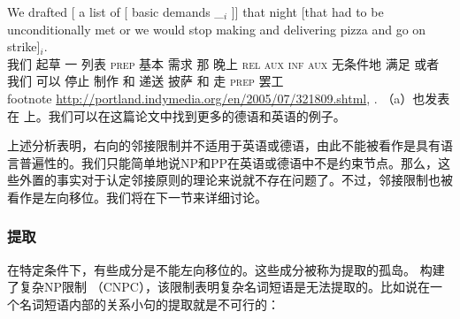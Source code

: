 \ex 
\gll We drafted [ a list of [ basic demands \_$_i$ ]] that night [that had to be unconditionally met or we would stop making and delivering pizza and go on strike]$_i$.\\
我们 起草 {} 一 列表 \textsc{prep} {} 基本 需求  {} {} 那 晚上 \spacebr\textsc{rel} \textsc{aux} \textsc{inf} \textsc{aux} 无条件地 满足 或者 我们 可以 停止 制作 和 递送 披萨 和 走 \textsc{prep} 罢工\\
footnote{%
\url{http://portland.indymedia.org/en/2005/07/321809.shtml}, .
}
\zl
（a）也发表在 上。我们可以在这篇论文中找到更多的德语和英语的例子。

上述分析表明，右向的邻接限制并不适用于英语或德语，由此不能被看作是具有语言普遍性的。我们只能简单地说NP和PP在英语或德语中不是约束节点。那么，这些外置的事实对于认定邻接原则的理论来说就不存在问题了。不过，邻接限制也被看作是左向移位。我们将在下一节来详细讨论。 

\subsubsection{提取}
\label{Abschnitt-Subjazenz-Extraktion}

在特定条件下，有些成分是不能左向移位的\citep{Ross67}。这些成分被称为提取的孤岛。 \citet[\S~4.1]{Ross67}构建了复杂NP限制 （CNPC），该限制表明复杂名词短语是无法提取的。比如说在一个名词短语内部的关系小句的提取就是不可行的： 

